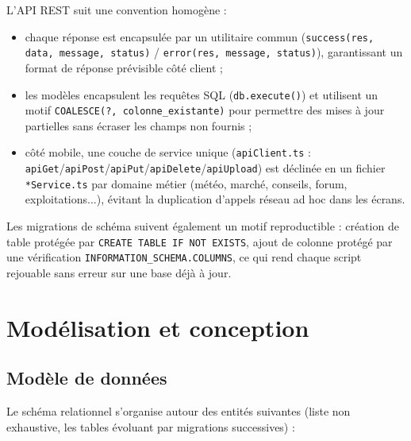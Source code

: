 \documentclass[12pt,a4paper]{report}
\begin{document}
L'API REST suit une convention homogène :
\begin{itemize}
    \item chaque réponse est encapsulée par un utilitaire commun (\texttt{success(res, data, message, status)} / \texttt{error(res, message, status)}), garantissant un format de réponse prévisible côté client ;
    \item les modèles encapsulent les requêtes SQL (\texttt{db.execute()}) et utilisent un motif \texttt{COALESCE(?, colonne\_existante)} pour permettre des mises à jour partielles sans écraser les champs non fournis ;
    \item côté mobile, une couche de service unique (\texttt{apiClient.ts} : \texttt{apiGet}/\texttt{apiPost}/\texttt{apiPut}/\texttt{apiDelete}/\texttt{apiUpload}) est déclinée en un fichier \texttt{*Service.ts} par domaine métier (météo, marché, conseils, forum, exploitations...), évitant la duplication d'appels réseau ad hoc dans les écrans.
\end{itemize}

Les migrations de schéma suivent également un motif reproductible : création de table protégée par \texttt{CREATE TABLE IF NOT EXISTS}, ajout de colonne protégé par une vérification \texttt{INFORMATION\_SCHEMA.COLUMNS}, ce qui rend chaque script rejouable sans erreur sur une base déjà à jour.

\chapter{Modélisation et conception}
\label{chap:conception}

\section{Modèle de données}

Le schéma relationnel s'organise autour des entités suivantes (liste non exhaustive, les tables évoluant par migrations successives) :
\end{document}
